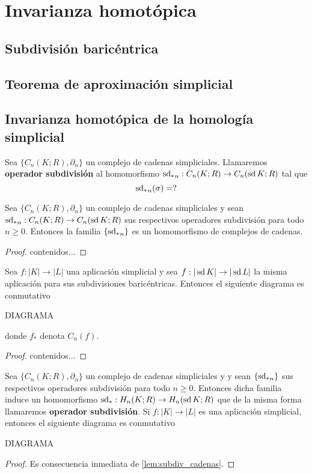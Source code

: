 
\chapter{Invarianza homotópica}
\section{Subdivisión baricéntrica}
\section{Teorema de aproximación simplicial}
\section{Invarianza homotópica de la homología simplicial}

\begin{definicion}
	\label{def:op_subdiv}
	Sea $\{C_n(K;R), \partial_n\}$ un complejo de cadenas simpliciales. Llamaremos \textbf{operador subdivisión} al homomorfismo ${\operatorname{sd}_*}_n : C_n(K;R) \to C_n(\operatorname{sd} K;R)$ tal que
	\[
	{\operatorname{sd}_*}_n(\sigma) = ?
	\]
\end{definicion}

\begin{lema}
	Sea $\{C_n(K;R), \partial_n\}$ un complejo de cadenas simpliciales y sean ${\operatorname{sd}_*}_n : C_n(K;R) \to C_n(\operatorname{sd} K;R)$ sus respectivos operadores subdivisión para todo $n \geq 0$. Entonces la familia $\{{\operatorname{sd}_*}_n\}$ es un homomorfismo de complejos de cadenas.
\end{lema}
\begin{proof}
	contenidos...
\end{proof}

\begin{lema}
	\label{lem:subdiv_cadenas}
	Sea $f: |K| \to |L|$ una aplicación simplicial y sea $f: |\operatorname{sd} K| \to |\operatorname{sd} L|$ la misma aplicación para sus subdivisiones baricéntricas. Entonces el siguiente diagrama es conmutativo
	
	DIAGRAMA
	
	donde $f_*$ denota $C_n(f)$.
\end{lema}
\begin{proof}
	contenidos...
\end{proof}

\begin{proposicion}
	Sea $\{C_n(K;R), \partial_n\}$ un complejo de cadenas simpliciales y  y sean $\{{\operatorname{sd}_*}_n\}$ sus respectivos operadores subdivisión para todo $n \geq 0$. Entonces dicha familia induce un homomorfismo $\operatorname{sd}_*: H_n(K;R) \to H_n(\operatorname{sd} K;R)$ que de la misma forma llamaremos \textbf{operador subdivisión}. Si $f: |K| \to |L|$ es una aplicación simplicial, entonces el siguiente diagrama es conmutativo
	
	DIAGRAMA
\end{proposicion}
\begin{proof}
	Es consecuencia inmediata de \autoref{lem:subdiv_cadenas}.
\end{proof}


